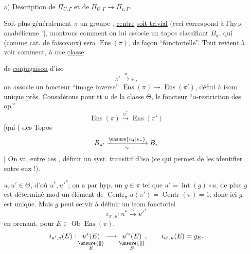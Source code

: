 a) \uline{Description} de \(\Pi_{U,\Gamma}\) et de \(\Pi_{U,\Gamma}\longrightarrow\Pi_{e,\Gamma}\).

Soit plus généralement \(\pi\) un groupe ,  
\uline{centre} \uline{soit trivial} (ceci correspond à l'hyp.
anabélienne !), montrons comment on
lui associe un topos classifiant
\(B_\pi\), qui (comme cat. de faisceaux) sera 
\(\operatorname{Ens}(\pi)\), de façon ``fonctorielle''. Tout
revient à voir comment, à une \uline{classe}

de \uline{conjugaison} \inserted{\(\Theta\)} d'iso
\[
\pi'\xrightarrow{u}\pi,
\]
on associe un foncteur ``image inverse''
\(\operatorname{Ens}(\pi)\longrightarrow\operatorname{Ens}(\pi')\), défini à isom unique
près. Considérons pour tt \(u\) de la classe
\(\Theta\), le foncteur ``\(u\)-restriction des op.''
\[
\operatorname{Ens}(\pi)\xrightarrow{u^*}\operatorname{Ens}(\pi')
\]
[qui 
 (  des Topos
\[
B_{\pi'}\xrightarrow[\sim]{\unsure{u_\bullet|u_*}} B_\pi
\]
]
On va, entre ces ,  définir un
syst. transitif d'iso (ce qui permet
de les identifier entre eux !).

 \(u,u'\in\Theta\), d'où \(u^*,u'^*\); on a par hyp.
 un \(g\in\pi\) tel que \(u'=\operatorname{int}(g)\circ u\),
de plus \(g\) est déterminé mod un
élément de \(\operatorname{Centr}_\pi u(\pi')=\operatorname{Centr}(\pi)=1\);
donc ici \(g\) est unique. Mais \(g\)
peut servir à définir un isom
fonctoriel 
\[
i_{u',u}:u^*\xrightarrow{\sim}u'^*
\]
en prenant, pour \(E\in\operatorname{Ob}\operatorname{Ens}(\pi)\),
\[
i_{u',u}(E):
\underset{\substack{\unsure{\Vert}\\E}}{u^*(E)}
\longrightarrow
\underset{\substack{\unsure{\Vert}\\E}}{u'^*(E)},
\qquad i_{u',u}(E)=g_E.
\]

